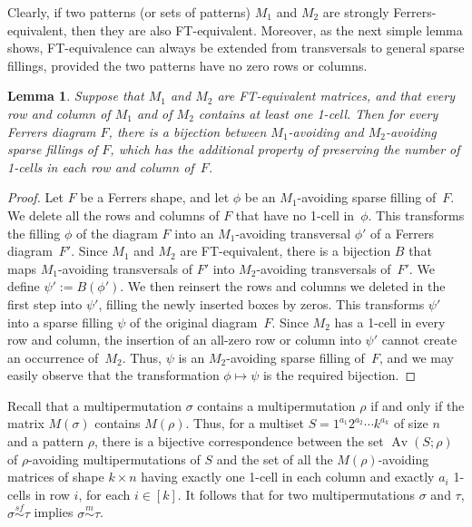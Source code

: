 \documentclass[11pt]{amsart}
\theoremstyle{plain}
\newtheorem{lemma}[theorem]{Lemma}
\theoremstyle{definition}
\newcommand{\msim}{\stackrel{m}{\sim}}
\newcommand{\sfsim}{\stackrel{sf}{\sim}}
\DeclareMathOperator{\Av}{Av}
\begin{document}
Clearly, if two patterns (or sets of patterns) $M_1$ and $M_2$ are strongly Ferrers-equivalent, then
they are also FT-equivalent. Moreover, as the next simple lemma shows, FT-equivalence can always be
extended from transversals to general sparse fillings, provided the two patterns have no zero rows or
columns.

\begin{lemma}\label{lem-sparse}
Suppose that $M_1$ and $M_2$ are FT-equivalent matrices, and that every row and column of $M_1$ and
of $M_2$ contains at least one 1-cell. Then for every Ferrers diagram $F$, there is a bijection
between $M_1$-avoiding and $M_2$-avoiding sparse fillings of $F$, which has the additional property
of preserving the number of 1-cells in each row and column of~$F$.
\end{lemma}
\begin{proof}
Let $F$ be a Ferrers shape, and let $\phi$ be an $M_1$-avoiding sparse filling of~$F$. We delete all
the rows and columns of $F$ that have no 1-cell in~$\phi$. This transforms the filling $\phi$ of the
diagram $F$ into an $M_1$-avoiding transversal $\phi'$ of a Ferrers diagram~$F'$. Since $M_1$ and
$M_2$ are FT-equivalent, there is a bijection $B$ that maps $M_1$-avoiding transversals of $F'$ into
$M_2$-avoiding transversals of~$F'$. We define $\psi':=B(\phi')$. We then reinsert the rows and
columns we deleted in the first step into $\psi'$, filling the newly inserted boxes by zeros. This
transforms $\psi'$ into a sparse filling $\psi$ of the original diagram~$F$. Since $M_2$ has a
1-cell in every row and column, the insertion of an all-zero row or column into $\psi'$ cannot
create an occurrence of~$M_2$. Thus, $\psi$ is an $M_2$-avoiding sparse filling of~$F$, and we may
easily observe that the transformation $\phi\mapsto\psi$ is the required bijection.
\end{proof}

Recall that a multipermutation $\sigma$ contains a multipermutation $\rho$ if and only if the matrix
$M(\sigma)$ contains $M(\rho)$. Thus, for a multiset
$S=1^{a_1}2^{a_2}\cdots k^{a_k}$ of size $n$ and a pattern $\rho$, there is a bijective
correspondence between the set $\Av(S;\rho)$ of $\rho$-avoiding multipermutations of $S$ and the set
of all the $M(\rho)$-avoiding matrices of shape $k\times n$ having exactly one 1-cell in each column
and exactly $a_i$ 1-cells in row $i$, for each $i\in[k]$. It follows that for two multipermutations
$\sigma$ and $\tau$, $\sigma\sfsim \tau$ implies $\sigma\msim\tau$.
\end{document}
